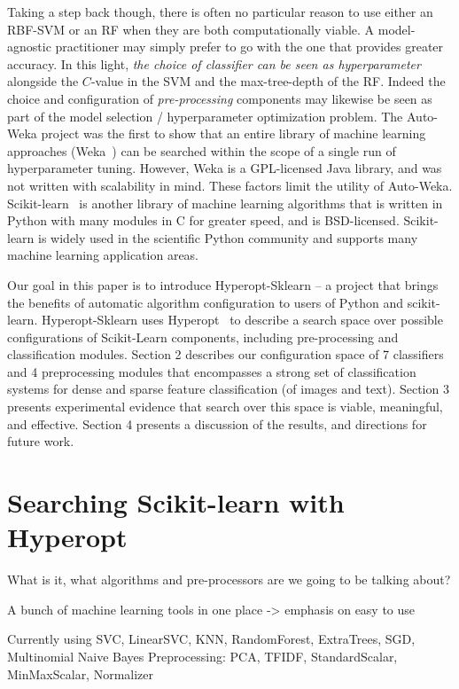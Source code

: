 \documentclass[wcp]{jmlr}
\begin{document}
Taking a step back though, there is often no particular reason to use either an RBF-SVM or an RF when they are both computationally viable.
A model-agnostic practitioner may simply prefer to go with the one that provides greater accuracy.
In this light, {\em the choice of classifier can be seen as hyperparameter} alongside the $C$-value in the SVM and the max-tree-depth of the RF.
Indeed the choice and configuration of {\em pre-processing} components may likewise be seen as part of the model selection / hyperparameter optimization problem.
The Auto-Weka project \citep{thornton+hutter+hoos+leyton-brown:2012} was the first to show that an entire library of machine learning approaches (Weka~\citep{hall2009weka}) can be searched within the scope of a single run of hyperparameter tuning.
However, Weka is a GPL-licensed Java library, and was not written with scalability in mind. These factors limit the utility of Auto-Weka.
Scikit-learn~\citep{sklearn} is another library of machine learning algorithms that is written in Python with many modules in C for greater speed, and is BSD-licensed.
Scikit-learn is widely used in the scientific Python community and supports many machine learning application areas.

Our goal in this paper is to introduce Hyperopt-Sklearn -- a project that brings the benefits of automatic algorithm configuration to users of Python and scikit-learn.
Hyperopt-Sklearn uses Hyperopt~\citep{hyperopt} to describe a search space over possible configurations of Scikit-Learn components, including pre-processing and classification modules.
Section 2 describes our configuration space of 7 classifiers and 4 preprocessing modules that encompasses a strong set of classification systems for dense and sparse feature classification (of images and text).
Section 3 presents experimental evidence that search over this space is viable, meaningful, and effective.
Section 4 presents a discussion of the results, and directions for future work.


\section{Searching Scikit-learn with Hyperopt}

What is it, what algorithms and pre-processors are we going to be talking about?

A bunch of machine learning tools in one place -> emphasis on easy to use

Currently using SVC, LinearSVC, KNN, RandomForest, ExtraTrees, SGD, Multinomial Naive Bayes
Preprocessing: PCA, TFIDF, StandardScalar, MinMaxScalar, Normalizer
\end{document}

